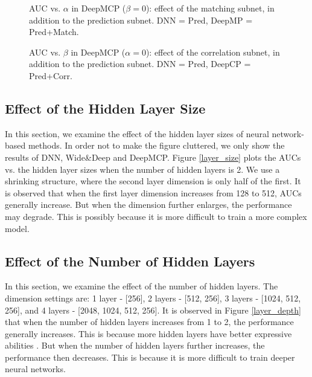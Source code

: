 \documentclass{article}
\begin{document}
\begin{figure}[!t]
\centering
{}
\vskip -8pt
\caption{AUC vs. $\alpha$ in DeepMCP ($\beta = 0$): effect of the matching subnet, in addition to the prediction subnet. DNN = Pred, DeepMP = Pred+Match.}
\vskip -10pt
\label{tune_m}
\end{figure}

\begin{figure}[!t]
\centering
{}
\vskip -8pt
\caption{AUC vs. $\beta$ in DeepMCP ($\alpha = 0$): effect of the correlation subnet, in addition to the prediction subnet. DNN = Pred, DeepCP = Pred+Corr.}
\vskip -10pt
\label{tune_c}
\end{figure}

\subsection{Effect of the Hidden Layer Size}
In this section, we examine the effect of the hidden layer sizes of neural network-based methods.
In order not to make the figure cluttered, we only show the results of DNN, Wide\&Deep and DeepMCP. Figure \ref{layer_size} plots the AUCs vs. the hidden layer sizes when the number of hidden layers is 2. We use a shrinking structure, where the second layer dimension is only half of the first. It is observed that when the first layer dimension increases from 128 to 512, AUCs generally increase. But when the dimension further enlarges, the performance may degrade. This is possibly because it is more difficult to train a more complex
model.

\subsection{Effect of the Number of Hidden Layers}
In this section, we examine the effect of the number of hidden layers.
The dimension settings are: 1 layer - [256], 2 layers - [512, 256], 3 layers - [1024, 512, 256], and 4 layers - [2048, 1024, 512, 256]. It is observed in Figure \ref{layer_depth} that when the number of hidden layers increases from 1 to 2, the performance generally increases. This is because more hidden layers have better expressive abilities \cite{he2017neural}. But when the number of hidden layers further increases, the performance then decreases. This is because it is more difficult to train deeper neural networks.
\end{document}
